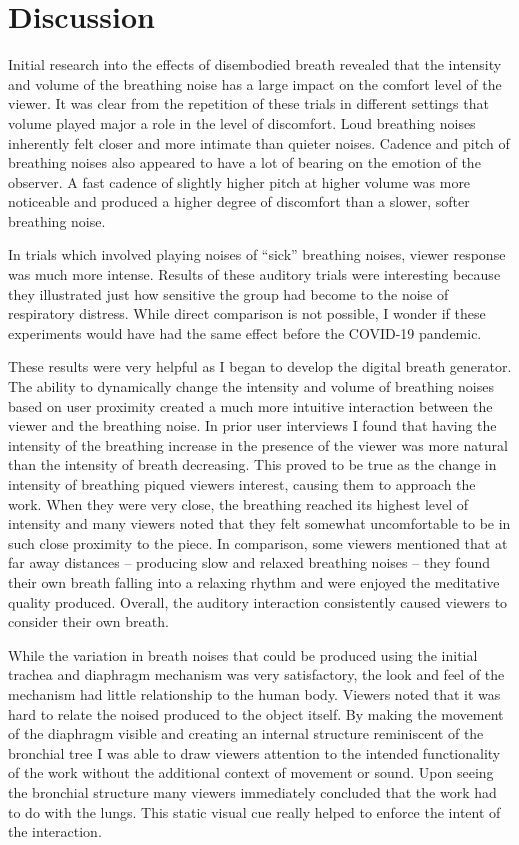 \documentclass[letterpaper]{article}
\begin{document}
\section{Discussion}

Initial research into the effects of disembodied breath revealed that the intensity and volume of the breathing noise has a large impact on the comfort level of the viewer. It was clear from the repetition of these trials in different settings that volume played major a role in the level of discomfort. Loud breathing noises inherently felt closer and more intimate than quieter noises. Cadence and pitch of breathing noises also appeared to have a lot of bearing on the emotion of the observer. A fast cadence of slightly higher pitch at higher volume was more noticeable and produced a higher degree of discomfort than a slower, softer breathing noise. 

In trials which involved playing noises of ``sick'' breathing noises, viewer response was much more intense. Results of these auditory trials were interesting because they illustrated just how sensitive the group had become to the noise of respiratory distress. While direct comparison is not possible, I wonder if these experiments would have had the same effect before the COVID-19 pandemic.  

These results were very helpful as I began to develop the digital breath generator. The ability to dynamically change the intensity and volume of breathing noises based on user proximity created a much more intuitive interaction between the viewer and the breathing noise. In prior user interviews I found that having the intensity of the breathing increase in the presence of the viewer was more natural than the intensity of breath decreasing. This proved to be true as the change in intensity of breathing piqued viewers interest, causing them to approach the work. When they were very close, the breathing reached its highest level of intensity and many viewers noted that they felt somewhat uncomfortable to be in such close proximity to the piece. In comparison, some viewers mentioned that at far away distances -- producing slow and relaxed breathing noises -- they found their own breath falling into a relaxing rhythm and were enjoyed the meditative quality produced. Overall, the auditory interaction consistently caused viewers to consider their own breath. 

While the variation in breath noises that could be produced using the initial trachea and diaphragm mechanism was very satisfactory, the look and feel of the mechanism had little relationship to the human body. Viewers noted that it was hard to relate the noised produced to the object itself. By making the movement of the diaphragm visible and creating an internal structure reminiscent of the bronchial tree I was able to draw viewers attention to the intended functionality of the work without the additional context of movement or sound. Upon seeing the bronchial structure many viewers immediately concluded that the work had to do with the lungs. This static visual cue really helped to enforce the intent of the interaction.
\end{document}
